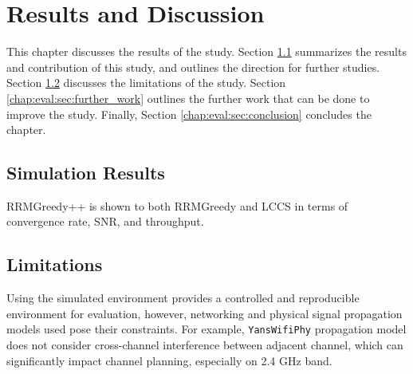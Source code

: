 \chapter{Results and Discussion}
\label{chap:eval}

This chapter discusses the results of the study.
Section \ref{chap:eval:sec:results} summarizes the results and contribution of this study, and outlines the direction for further studies. Section \ref{chap:eval:sec:limitations} discusses the limitations of the study. Section \ref{chap:eval:sec:further_work} outlines the further work that can be done to improve the study. Finally, Section \ref{chap:eval:sec:conclusion} concludes the chapter.

\section{Simulation Results}
\label{chap:eval:sec:results}
RRMGreedy++ is shown to both RRMGreedy and LCCS in terms of convergence rate, SNR, and throughput.

\section{Limitations}
\label{chap:eval:sec:limitations}

Using the simulated environment provides a controlled and reproducible environment for evaluation, however, networking and physical signal propagation models used pose their constraints. For example, \texttt{YansWifiPhy} propagation model does not consider cross-channel interference between adjacent channel, which can significantly impact channel planning, especially on 2.4 GHz band.

